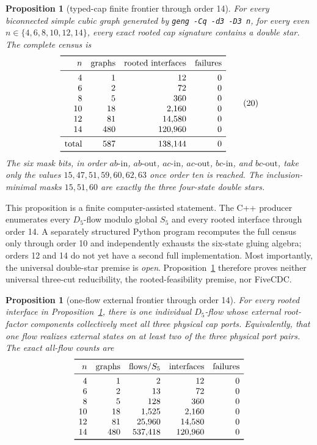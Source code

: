 \documentclass[11pt]{article}
\newtheorem{proposition}[theorem]{Proposition}
\theoremstyle{definition}
\theoremstyle{remark}
\begin{document}
\begin{proposition}[typed-cap finite frontier through order 14]
\label{prop:typed-cap-frontier}
For every biconnected simple cubic graph generated by
\texttt{geng -Cq -d3 -D3 n}, for every even
\(n\in\{4,6,8,10,12,14\}\), every exact rooted cap signature contains a
double star.  The complete census is
\[
\begin{array}{rrrr}
\toprule
n&\text{graphs}&\text{rooted interfaces}&\text{failures}\\
\midrule
4&1&12&0\\
6&2&72&0\\
8&5&360&0\\
10&18&2{,}160&0\\
12&81&14{,}580&0\\
14&480&120{,}960&0\\
\midrule
\text{total}&587&138{,}144&0\\
\bottomrule
\end{array}                                                   \tag{20}
\]
The six mask bits, in order \(ab\text{-in}\), \(ab\text{-out}\),
\(ac\text{-in}\), \(ac\text{-out}\), \(bc\text{-in}\), and
\(bc\text{-out}\), take only the values
\(15,47,51,59,60,62,63\) once order ten is reached.  The inclusion-minimal
masks \(15,51,60\) are exactly the three four-state double stars.
\end{proposition}

This proposition is a finite computer-assisted statement.  The C++
producer enumerates every \(D_5\)-flow modulo global \(S_5\) and every
rooted interface through order 14.  A separately structured Python program
recomputes the full census only through order 10 and independently exhausts
the six-state gluing algebra; orders 12 and 14 do not yet have a second full
implementation.  Most importantly, the universal double-star premise is
\emph{open}.  Proposition~\ref{prop:typed-cap-frontier} therefore proves
neither universal three-cut reducibility, the rooted-feasibility premise,
nor FiveCDC.

\begin{proposition}[one-flow external frontier through order 14]
\label{prop:simultaneous-external-frontier}
For every rooted interface in Proposition~\ref{prop:typed-cap-frontier},
there is one individual \(D_5\)-flow whose external root-factor components
collectively meet all three physical cap ports.  Equivalently, that one
flow realizes external states on at least two of the three physical port
pairs.  The exact all-flow counts are
\[
\begin{array}{rrrrr}
\toprule
n&\text{graphs}&\text{flows}/S_5&\text{interfaces}&\text{failures}\\
\midrule
4&1&2&12&0\\
6&2&13&72&0\\
8&5&128&360&0\\
10&18&1{,}525&2{,}160&0\\
12&81&25{,}960&14{,}580&0\\
14&480&537{,}418&120{,}960&0\\
\bottomrule
\end{array}
\]
\end{proposition}
\end{document}
